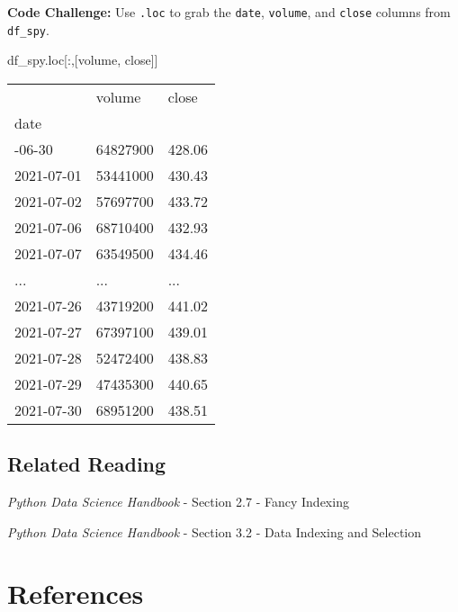 \documentclass[
  letterpaper,
  DIV=11,
  numbers=noendperiod]{scrreprt}
\newenvironment{Shaded}{\begin{snugshade}}{\end{snugshade}}
\newcommand{\NormalTok}[1]{\textcolor[rgb]{0.00,0.23,0.31}{#1}}
\newcommand{\StringTok}[1]{\textcolor[rgb]{0.13,0.47,0.30}{#1}}
\newlength{\cslhangindent}
\newlength{\cslentryspacingunit} %
\newenvironment{CSLReferences}[2] %
 {%
  \setlength{\parindent}{0pt}
  \ifodd #1
  \let\oldpar\par
  \def\par{\hangindent=\cslhangindent\oldpar}
  \fi
  \setlength{\parskip}{#2\cslentryspacingunit}
 }%
 {}
\begin{document}
\textbf{Code Challenge:} Use \texttt{.loc} to grab the \texttt{date},
\texttt{volume}, and \texttt{close} columns from \texttt{df\_spy}.

\begin{Shaded}
\begin{Highlighting}[]
\NormalTok{df\_spy.loc[:,[}\StringTok{\textquotesingle{}volume\textquotesingle{}}\NormalTok{, }\StringTok{\textquotesingle{}close\textquotesingle{}}\NormalTok{]]}
\end{Highlighting}
\end{Shaded}

\begin{longtable}[]{@{}lll@{}}
\toprule\noalign{}
& volume & close \\
date & & \\
\midrule\noalign{}
\endhead
\bottomrule\noalign{}
\endlastfoot
2021-06-30 & 64827900 & 428.06 \\
2021-07-01 & 53441000 & 430.43 \\
2021-07-02 & 57697700 & 433.72 \\
2021-07-06 & 68710400 & 432.93 \\
2021-07-07 & 63549500 & 434.46 \\
... & ... & ... \\
2021-07-26 & 43719200 & 441.02 \\
2021-07-27 & 67397100 & 439.01 \\
2021-07-28 & 52472400 & 438.83 \\
2021-07-29 & 47435300 & 440.65 \\
2021-07-30 & 68951200 & 438.51 \\
\end{longtable}

\hypertarget{related-reading-1}{%
\section{Related Reading}\label{related-reading-1}}

\emph{Python Data Science Handbook} - Section 2.7 - Fancy Indexing

\emph{Python Data Science Handbook} - Section 3.2 - Data Indexing and
Selection


\hypertarget{references}{%
\chapter*{References}\label{references}}


\hypertarget{refs}{}
\begin{CSLReferences}{0}{0}
\end{CSLReferences}
\end{document}
